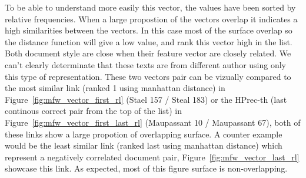 To be able to understand more easily this vector, the values have been sorted by relative frequencies.
When a large propostion of the vectors overlap it indicates a high similarities between the vectors.
In this case most of the surface overlap so the distance function will give a low value, and rank this vector high in the list.
Both document style are close when their feature vector are closely related.
We can't clearly determinate that these texts are from different author using only this type of representation.
These two vectors pair can be vizually compared to the most similar link (ranked 1 using manhattan distance) in Figure~\ref{fig:mfw_vector_first_rl} (Stael 157 / Steal 183) or the HPrec-th (last continous correct pair from the top of the list) in Figure~\ref{fig:mfw_vector_first_last_rl} (Maupassant 10 / Maupassant 67), both of these links show a large propotion of overlapping surface.
A counter example would be the least similar link (ranked last using manhattan distance) which represent a negatively correlated document pair, Figure~\ref{fig:mfw_vector_last_rl} showcase this link.
As expected, most of this figure surface is non-overlapping.

